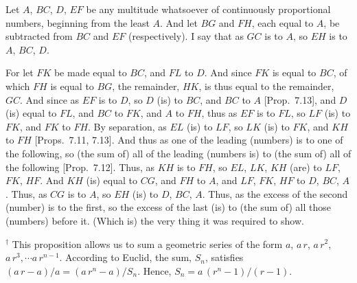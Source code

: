 \begin{Parallel}{}{}
{\epsfysize=1.6in
\centerline{}

Let $A$, $BC$, $D$, $EF$ be any multitude whatsoever of continuously proportional numbers, beginning from the least $A$.  And let $BG$ and
$FH$, each equal to $A$, be subtracted from $BC$ and $EF$ (respectively). I say that as $GC$ is to $A$, so $EH$ is to $A$, $BC$, $D$.

For let $FK$ be made equal to $BC$, and $FL$ to  $D$. And since $FK$
is equal to $BC$, of which $FH$ is equal to $BG$, the remainder,
$HK$,  is thus equal to the remainder, $GC$. And since as $EF$ is to $D$, so
$D$ (is) to $BC$, and $BC$ to $A$ [Prop.~7.13],
and $D$ (is) equal to $FL$, and $BC$ to $FK$, and $A$ to  $FH$, thus
as $EF$ is to $FL$, so $LF$ (is) to $FK$, and $FK$ to $FH$. By
separation, as $EL$ (is) to $LF$, so $LK$ (is) to $FK$, and $KH$ to $FH$
[Props.~7.11, 7.13]. And thus
as one of the leading (numbers) is to one of the following, so (the sum of) all of the leading (numbers is) to (the sum of) all of the following [Prop.~7.12]. Thus, as $KH$ is to $FH$, so
$EL$, $LK$, $KH$ (are) to $LF$, $FK$, $HF$.  And $KH$ (is) equal to
$CG$, and $FH$ to $A$, and $LF$, $FK$, $HF$ to $D$, $BC$, $A$.
Thus, as $CG$ is to $A$, so $EH$ (is) to $D$, $BC$, $A$. Thus,
as the excess of the second (number) is to the first, so the excess of the last
(is) to (the sum of) all  those (numbers) before it. (Which is) the very thing it was required to show.}
\end{Parallel}
{\footnotesize\noindent$^\dag$ This proposition allows us to sum a geometric series of the form $a$, $a\,r$, $a\,r^2$, $a\,r^3,\cdots a\,r^{n-1}$. 
According to Euclid, the sum, $S_n$,  satisfies
$(a\,r-a)/a = (a\,r^n-a)/S_n$. Hence, $S_n= a\,(r^n-1)/(r-1)$.}

